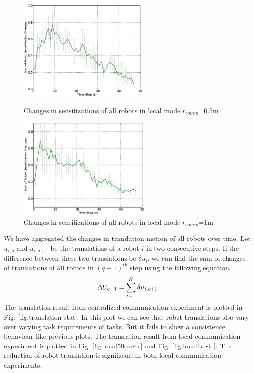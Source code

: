 \documentclass[letterpaper, 10 pt, conference]{ieeeconf}  %
\begin{document}
\begin{figure}
\begin{minipage}[t]{0.5\linewidth}
\centering
\includegraphics[height=5cm, angle=0]
{images/local-500cm/RobotSensitizationStat-Total-50steps.eps}
\caption{\small Changes in sensitizations of all robots in local mode $r_{comm}$=0.5m}
\label{fig:local50cm-sensitization-stat} %
\end{minipage}
\hspace{0.5cm}
\begin{minipage}[t]{0.5\linewidth}
\centering
\includegraphics[height=5cm, angle=0]{images/local-1m/RobotSensitizationStat-Total-50steps.eps}
\caption{\small Changes in sensitizations of all robots in local mode $r_{comm}$=1m}
\label{fig:local1m-sz} %
\end{minipage}
\end{figure}
We have aggregated the changes in translation motion of all robots over time. Let $u_{i,q}$ and $u_{i,q+1}$ be the translations of a robot $i$ in two consecutive steps. If the difference between these two translations be $\delta u_{i}$, we can find the sum of changes of translations of all robots in $(q+1)^{th}$ step using the following equation.
\begin{equation}
\small 
\Delta U_{q+1} = \sum_{i=1}^{N} \delta u_{i, q+1} 
\label{eqn:Delta-Tr}
\end{equation}
The translation result from centralized communication experiment is plotted in Fig. \ref{fig:translation-stat}. In this plot we can see that robot translations also vary over varying task requirements of tasks. But it fails to show a consistence behaviour like previous plots. The translation result from local communication experiment is plotted in Fig. \ref{fig:local50cm-tr} and Fig. \ref{fig:local1m-tr}. The reduction of robot translation is significant in both local communication experiments.\\
\end{document}
